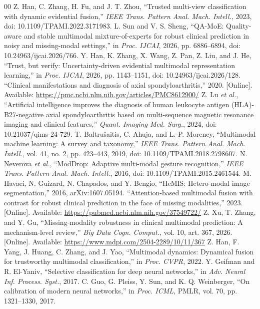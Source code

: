\documentclass[conference]{IEEEtran}
\begin{document}
\begin{thebibliography}{00}
 Z. Han, C. Zhang, H. Fu, and J. T. Zhou, ``Trusted multi-view classification with dynamic evidential fusion,'' \emph{IEEE Trans. Pattern Anal. Mach. Intell.}, 2023, doi: 10.1109/TPAMI.2022.3171983.
 L. Sun and V. S. Sheng, ``QA-MoE: Quality-aware and stable multimodal mixture-of-experts for robust clinical prediction in noisy and missing-modal settings,'' in \emph{Proc. IJCAI}, 2026, pp. 6886--6894, doi: 10.24963/ijcai.2026/766.
 Y. Han, K. Zhang, X. Wang, Z. Pan, Z. Liu, and J. He, ``Trust, but verify: Uncertainty-driven evidential multimodal representation learning,'' in \emph{Proc. IJCAI}, 2026, pp. 1143--1151, doi: 10.24963/ijcai.2026/128.
 ``Clinical manifestations and diagnosis of axial spondyloarthritis,'' 2020. [Online]. Available: \url{https://pmc.ncbi.nlm.nih.gov/articles/PMC8612900/}
 Z. Lu \emph{et al.}, ``Artificial intelligence improves the diagnosis of human leukocyte antigen (HLA)-B27-negative axial spondyloarthritis based on multi-sequence magnetic resonance imaging and clinical features,'' \emph{Quant. Imaging Med. Surg.}, 2024, doi: 10.21037/qims-24-729.
 T. Baltru\v{s}aitis, C. Ahuja, and L.-P. Morency, ``Multimodal machine learning: A survey and taxonomy,'' \emph{IEEE Trans. Pattern Anal. Mach. Intell.}, vol. 41, no. 2, pp. 423--443, 2019, doi: 10.1109/TPAMI.2018.2798607.
 N. Neverova \emph{et al.}, ``ModDrop: Adaptive multi-modal gesture recognition,'' \emph{IEEE Trans. Pattern Anal. Mach. Intell.}, 2016, doi: 10.1109/TPAMI.2015.2461544.
 M. Havaei, N. Guizard, N. Chapados, and Y. Bengio, ``HeMIS: Hetero-modal image segmentation,'' 2016, arXiv:1607.05194.
 ``Attention-based multimodal fusion with contrast for robust clinical prediction in the face of missing modalities,'' 2023. [Online]. Available: \url{https://pubmed.ncbi.nlm.nih.gov/37549722/}
 Z. Xu, T. Zhang, and Y. Gu, ``Missing-modality robustness in clinical multimodal prediction: A mechanism-level review,'' \emph{Big Data Cogn. Comput.}, vol. 10, art. 367, 2026. [Online]. Available: \url{https://www.mdpi.com/2504-2289/10/11/367}
 Z. Han, F. Yang, J. Huang, C. Zhang, and J. Yao, ``Multimodal dynamics: Dynamical fusion for trustworthy multimodal classification,'' in \emph{Proc. CVPR}, 2022.
 Y. Geifman and R. El-Yaniv, ``Selective classification for deep neural networks,'' in \emph{Adv. Neural Inf. Process. Syst.}, 2017.
 C. Guo, G. Pleiss, Y. Sun, and K. Q. Weinberger, ``On calibration of modern neural networks,'' in \emph{Proc. ICML}, PMLR, vol. 70, pp. 1321--1330, 2017.

\end{thebibliography}
\end{document}
